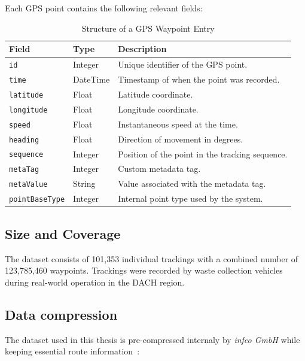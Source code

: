\documentclass[a4paper,12pt,twoside]{scrreprt}
\begin{document}
Each GPS point contains the following relevant fields:
\begin{table}[H]
  \centering
  \begin{tabular}{|l|l|p{8cm}|}
    \hline
    \textbf{Field}         & \textbf{Type} & \textbf{Description}
    \\
    \hline
    \texttt{id}            & Integer       & Unique identifier of the GPS
    point.
    \\
    \hline
    \texttt{time}          & DateTime      & Timestamp of when the point was
    recorded.
    \\
    \hline
    \texttt{latitude}      & Float         & Latitude coordinate.
    \\
    \hline
    \texttt{longitude}     & Float         & Longitude coordinate.
    \\
    \hline
    \texttt{speed}         & Float         & Instantaneous speed at the time.
    \\
    \hline
    \texttt{heading}       & Float         & Direction of movement in degrees.
    \\
    \hline
    \texttt{sequence}      & Integer       & Position of the point in the
    tracking
    sequence.
    \\
    \hline
    \texttt{metaTag}       & Integer       & Custom metadata tag.
    \\
    \hline
    \texttt{metaValue}     & String        & Value associated with the metadata
    tag.
    \\
    \hline
    \texttt{pointBaseType} & Integer       & Internal point type used by the
    system.
    \\
    \hline
  \end{tabular}
  \caption{Structure of a GPS Waypoint Entry}
  \label{tab:gps_point_structure}
\end{table}

\clearpage
\subsection{Size and Coverage}

The dataset consists of 101,353 individual trackings with a combined number of
123,785,460 waypoints.
Trackings were recorded by waste collection vehicles during real-world
operation in the DACH
region.

\subsection{Data compression}
The dataset used in this thesis is pre-compressed internaly by \textit{infeo
  GmbH} while keeping essential route information~\cite{noauthor_route_nodate}:
\end{document}
